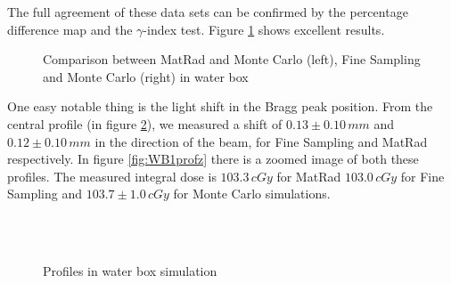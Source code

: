 \documentclass[12pt, a4paper, twoside]{book}
\begin{document}
The full agreement of these data sets can be confirmed by the percentage difference map and the $\gamma$-index test. Figure \ref{fig:WB1gam} shows excellent results.
\begin{figure}[!ht]
\centering
{} 
\caption{Comparison between MatRad and Monte Carlo (left), Fine Sampling and Monte Carlo (right) in water box}
\label{fig:WB1gam}
\end{figure}

One easy notable thing is the light shift in the Bragg peak position. From the central profile (in figure \ref{fig:WB1prof}), we measured a shift of $0.13\pm0.10\,mm$ and $0.12\pm0.10\,mm$ in the direction of the beam, for Fine Sampling and MatRad respectively. In figure \ref{fig:WB1profz} there is a zoomed image of both these profiles.
The measured integral dose is $103.3\,cGy$ for MatRad $103.0\,cGy$ for Fine Sampling and $103.7\pm1.0\,cGy$ for Monte Carlo simulations.\\
\\

\begin{figure}[!ht]
\centering
{} 
 \\
\caption{Profiles in water box simulation}
\label{fig:WB1prof}
\end{figure}
\end{document}
